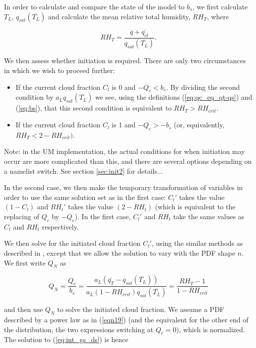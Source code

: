 \documentclass{UMDP_article}
\begin{document}
In order to calculate and compare the state of the model to $b_s$,
we first calculate $T_L$, $q_{sat}(\overline{T_L})$ and calculate
the mean relative total humidity, $RH_T$, where

\begin{equation}
RH_T = \frac{ \overline{q} + \overline{q_{cl}} } {q_{sat}(\overline{T_L}) } .
\label{eq:rht}
\end{equation}

We then assess whether initiation is required. There are only two
circumstances in which we wish to proceed further:
\begin{itemize}
\item{If the current cloud fraction $C_l$ is 0 and $-Q_c < b_s$. By dividing the second condition by $a_L q_{sat} (\overline{T_L})$ we see, using the definitions (\ref{eq:qc_eq_qt-qs}) and (\ref{eq:bs}), that this second condition is equivalent to $RH_T > RH_{crit}$.}
\item{If the current cloud fraction $C_l$ is 1 and $-Q_c > -b_s$ (or, equivalently, $RH_T < 2 - RH_{crit})$.}
\end{itemize}
Note: in the UM implementation, the actual conditions for when initiation
may occur are more complicated than this, and there are several options
depending on a namelist switch.  See section \ref{sec:init2} for details...

In the second case, we then make the temporary transformation of variables
in order to use the same solution set as in the first case: $C_l'$ takes the
value $(1-C_l)$ and $RH_t'$ takes the value $(2-RH_t)$ (which is equivalent
to the replacing of $Q_c$ by $-Q_c$). In the first case, $C_l'$ and $RH_t$ take
the same values as $C_l$ and $RH_t$ respectively.

We then solve for the initiated cloud fraction $C_l'$, using the similar
methods as described in , except
that we allow the solution to vary with the PDF shape $n$. We first
write $Q_N$ as

\begin{equation}
Q_N = \frac{Q_c}{b_s} = \frac{ a_L (\overline{q_T} - q_{sat}(\overline{T_L})) }
{ a_L (1 - RH_{crit}) q_{sat} (\overline{T_L})} = \frac{RH_T - 1}{1-RH_{crit}}
\label{eq:qn_def}
\end{equation}

and then use $Q_N$ to solve the initiated cloud fraction. We assume a PDF
described by a power law as in (\ref{eqn19}) (and the equivalent for the
other end of the distribution, the two expressions switching at $Q_c=0$),
which is normalized. The solution to (\ref{eq:int_gs_ds}) is hence 
\end{document}
